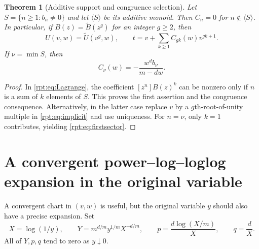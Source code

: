\documentclass[11pt,a4paper]{article}
\numberwithin{equation}{section}
\newtheorem{theorem}{Theorem}[section]
\theoremstyle{definition}\newtheorem{definition}[theorem]{Definition}
\theoremstyle{remark}\newtheorem{remark}[theorem]{Remark}
\newcommand{\coef}[2]{[#1^{#2}]}
\begin{document}
\begin{theorem}[Additive support and congruence selection]
\label{rpt:thm:support}
Let $S=\{n\ge1:b_n\ne0\}$ and let $\langle S\rangle$ be its additive monoid. Then $C_n=0$ for $n\notin\langle S\rangle$. In particular, if $B(z)=\widetilde B(z^g)$ for an integer $g\ge2$, then
\begin{equation}
U(v,w)=\widetilde U(v^g,w),\qquad
 t=v+\sum_{k\ge1}C_{gk}(w)v^{gk+1}.
\label{rpt:eq:sectorselect}
\end{equation}
If $\nu=\min S$, then
\begin{equation}
C_\nu(w)=-\frac{w^d b_\nu}{m-dw}.
\label{rpt:eq:firstsector}
\end{equation}
\end{theorem}
\begin{proof}
In \eqref{rpt:eq:Lagrange}, the coefficient $\coef{z}{n}B(z)^k$ can be nonzero only if $n$ is a sum of $k$ elements of $S$. This proves the first assertion and the congruence consequence. Alternatively, in the latter case replace $v$ by a $g$th-root-of-unity multiple in \eqref{rpt:eq:implicit} and use uniqueness. For $n=\nu$, only $k=1$ contributes, yielding \eqref{rpt:eq:firstsector}.
\end{proof}

\section{A convergent power--log--loglog expansion in the original variable}
\label{rpt:sec:original}

A convergent chart in $(v,w)$ is useful, but the original variable $y$ should also have a precise expansion. Set
\begin{equation}
X=\log(1/y),\qquad
Y=m^{d/m}y^{1/m}X^{-d/m},\qquad
p=\frac{d\log(X/m)}{X},\qquad q=\frac dX.
\label{rpt:eq:coordinates}
\end{equation}
All of $Y,p,q$ tend to zero as $y\downarrow0$.
\end{document}
